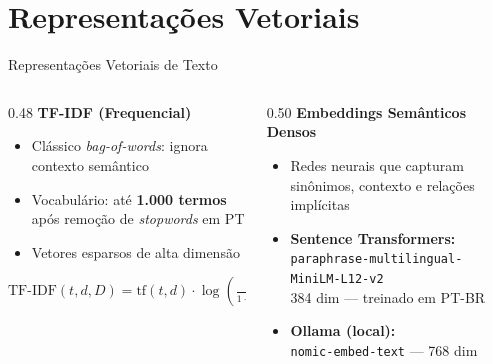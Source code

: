 \documentclass[aspectratio=169]{beamer}
\begin{document}
\section{Representações Vetoriais}
\begin{frame}{Representações Vetoriais de Texto}
  \begin{columns}[T]
    \begin{column}{0.48\textwidth}
      \textbf{\color{ufrnblue}TF-IDF (Frequencial)}
      \begin{itemize}
        \item Clássico \textit{bag-of-words}: ignora contexto semântico
        \item Vocabulário: até \textbf{1.000 termos} após remoção de
              \textit{stopwords} em PT
        \item Vetores esparsos de alta dimensão
      \end{itemize}
      \[ \mathrm{TF\text{-}IDF}(t,d,D) = \mathrm{tf}(t,d)\cdot
         \log\!\left(\tfrac{|D|}{1+|\{d:t\in d\}|}\right) \]
    \end{column}
    \begin{column}{0.50\textwidth}
      \textbf{\color{ufrnblue}Embeddings Semânticos Densos}
      \begin{itemize}
        \item Redes neurais que capturam sinônimos, contexto e relações implícitas
        \item \textbf{Sentence Transformers:}\\
              \texttt{\small paraphrase-multilingual-MiniLM-L12-v2}\\
              384 dim — \alert{treinado em PT-BR}
        \item \textbf{Ollama (local):}\\
              \texttt{nomic-embed-text} — 768 dim
      \end{itemize}
    \end{column}
  \end{columns}
\end{frame}

\end{document}
